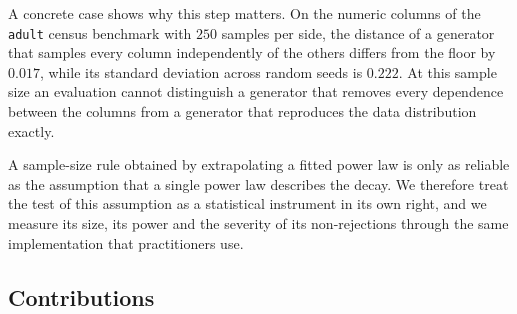 \documentclass[twoside,11pt]{article}
\theoremstyle{plain}
\theoremstyle{definition}
\theoremstyle{remark}
\begin{document}
A concrete case shows why this step matters. On the numeric columns of the
\texttt{adult} census benchmark with $250$ samples per side, the distance of
a generator that samples every column independently of the others differs
from the floor by $0.017$, while its standard deviation across random seeds
is $0.222$. At this sample size an evaluation cannot distinguish a generator
that removes every dependence between the columns from a generator that
reproduces the data distribution exactly.

A sample-size rule obtained by extrapolating a fitted power law is only as
reliable as the assumption that a single power law describes the decay. We
therefore treat the test of this assumption as a statistical instrument in
its own right, and we measure its size, its power and the severity of its
non-rejections through the same implementation that practitioners use.

\subsection{Contributions}\label{sec:intro-contributions}
\end{document}
